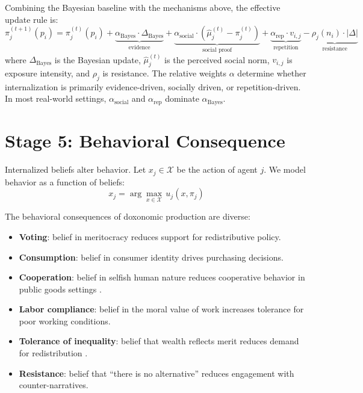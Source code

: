 \begin{model}
\label{mod:augmented-internalization}
Combining the Bayesian baseline with the mechanisms above, the effective update rule is:
\begin{equation}
\label{eq:augmented-update}
  \pi_j^{(t+1)}(p_i) = \pi_j^{(t)}(p_i) + \underbrace{\alpha_{\text{Bayes}} \cdot \Delta_{\text{Bayes}}}_{\text{evidence}} + \underbrace{\alpha_{\text{social}} \cdot (\hat{\mu}_j^{(t)} - \pi_j^{(t)})}_{\text{social proof}} + \underbrace{\alpha_{\text{rep}} \cdot v_{i,j}}_{\text{repetition}} - \underbrace{\rho_j(n_i) \cdot |\Delta|}_{\text{resistance}}
\end{equation}
where $\Delta_{\text{Bayes}}$ is the Bayesian update, $\hat{\mu}_j^{(t)}$ is the perceived social norm, $v_{i,j}$ is exposure intensity, and $\rho_j$ is resistance.
The relative weights $\alpha$ determine whether internalization is primarily evidence-driven, socially driven, or repetition-driven.
In most real-world settings, $\alpha_{\text{social}}$ and $\alpha_{\text{rep}}$ dominate $\alpha_{\text{Bayes}}$.
\end{model}


\section{Stage 5: Behavioral Consequence}
\label{sec:ch5-behavior}

Internalized beliefs alter behavior.
Let $x_j \in \mathcal{X}$ be the action of agent $j$.
We model behavior as a function of beliefs:
\[
  x_j = \arg\max_{x \in \mathcal{X}} \, u_j(x, \pi_j)
\]

The behavioral consequences of doxonomic production are diverse:
\begin{itemize}[nosep]
  \item \textbf{Voting}: belief in meritocracy reduces support for redistributive policy.
  \item \textbf{Consumption}: belief in consumer identity drives purchasing decisions.
  \item \textbf{Cooperation}: belief in selfish human nature reduces cooperative behavior in public goods settings \autocite{fischbacher2001}.
  \item \textbf{Labor compliance}: belief in the moral value of work increases tolerance for poor working conditions.
  \item \textbf{Tolerance of inequality}: belief that wealth reflects merit reduces demand for redistribution \autocite{piketty2014}.
  \item \textbf{Resistance}: belief that ``there is no alternative'' reduces engagement with counter-narratives.
\end{itemize}

